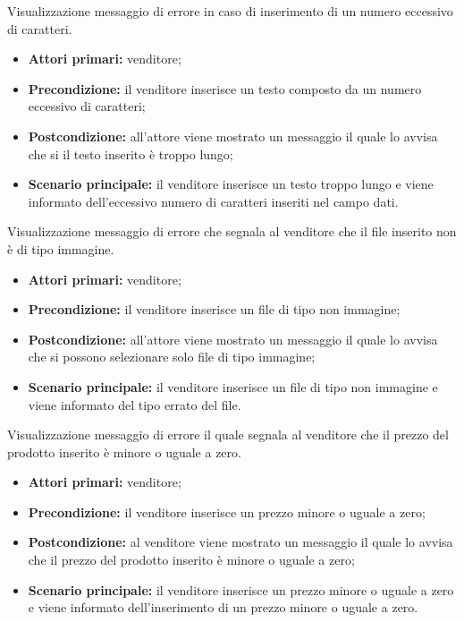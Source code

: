 Visualizzazione messaggio di errore in caso di inserimento di un numero eccessivo di caratteri.
\begin{itemize}
	\item \textbf{Attori primari:} venditore;
	\item \textbf{Precondizione:} il venditore inserisce un testo composto da un numero eccessivo di caratteri;
	\item \textbf{Postcondizione:} all'attore viene mostrato un messaggio il quale lo avvisa che si il testo inserito è troppo lungo;
	\item \textbf{Scenario principale:} il venditore inserisce un testo troppo lungo e viene informato dell'eccessivo numero di caratteri inseriti nel campo dati.
\end{itemize}

Visualizzazione messaggio di errore che segnala al venditore che il file inserito non è di tipo immagine.
\begin{itemize}
    \item \textbf{Attori primari:} venditore;
    \item \textbf{Precondizione:} il venditore inserisce un file di tipo non immagine;
    \item \textbf{Postcondizione:} all'attore viene mostrato un messaggio il quale lo avvisa che si possono selezionare solo file di tipo immagine;
    \item \textbf{Scenario principale:} il venditore inserisce un file di tipo non immagine e viene informato del tipo errato del file.
\end{itemize}

Visualizzazione messaggio di errore il quale segnala al venditore che il prezzo del prodotto inserito è minore o uguale a zero.
\begin{itemize}
    \item \textbf{Attori primari:} venditore;
    \item \textbf{Precondizione:} il venditore inserisce un prezzo minore o uguale a zero;
    \item \textbf{Postcondizione:} al venditore viene mostrato un messaggio il quale lo avvisa che il prezzo del prodotto inserito è minore o uguale a zero;
    \item \textbf{Scenario principale:} il venditore inserisce un prezzo minore o uguale a zero e viene informato dell'inserimento di un prezzo minore o uguale a zero.
\end{itemize}


